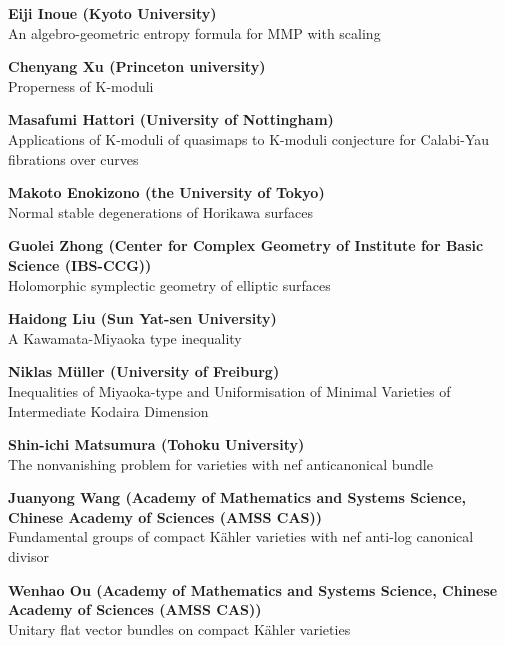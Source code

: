 \documentclass[dvipdfmx,a4paper,12pt]{article}
\theoremstyle{plain} %
\theoremstyle{definition} %
\begin{document}
{\bf Eiji Inoue (Kyoto University)}\\
An algebro-geometric entropy formula for MMP with scaling
\vskip5mm

\vskip1mm
{\bf Chenyang Xu (Princeton university)}\\
Properness of K-moduli
\vskip3mm

{\bf Masafumi Hattori (University of Nottingham)}\\
Applications of K-moduli of quasimaps to K-moduli conjecture for Calabi-Yau fibrations over curves
\vskip3mm

{\bf Makoto Enokizono (the University of Tokyo)}\\
Normal stable degenerations of Horikawa surfaces
\vskip3mm

{\bf Guolei Zhong (Center for Complex Geometry of Institute for Basic Science (IBS-CCG))}\\
Holomorphic symplectic geometry of elliptic surfaces
\vskip5mm

\newpage
{}
\vskip1mm
{\bf Haidong Liu (Sun Yat-sen University)}\\
A Kawamata-Miyaoka type inequality
\vskip3mm

{\bf Niklas Müller (University of Freiburg)}\\
Inequalities of Miyaoka-type and Uniformisation of Minimal Varieties of Intermediate Kodaira Dimension
\vskip5mm

\vskip1mm
{\bf Shin-ichi Matsumura (Tohoku University)}\\
The nonvanishing problem for varieties with nef anticanonical bundle
\vskip3mm

{\bf Juanyong Wang (Academy of Mathematics and Systems Science, Chinese Academy of Sciences (AMSS CAS))}\\
Fundamental groups of compact Kähler varieties with nef anti-log canonical divisor
\vskip3mm

{\bf Wenhao Ou (Academy of Mathematics and Systems Science, Chinese Academy of Sciences (AMSS CAS))}\\
Unitary flat vector bundles on compact K\"ahler varieties 
\vskip3mm
\end{document}
